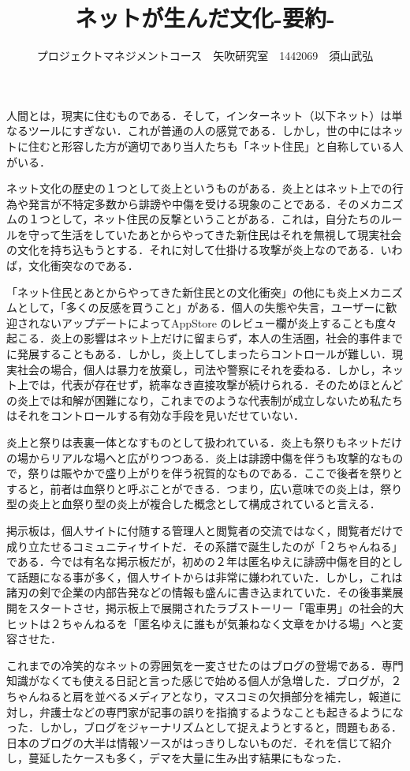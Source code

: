 \documentclass[uplatex,twocolumn,dvipdfmx]{jsarticle}
\title{\vspace{-5mm}\fontsize{14pt}{0pt}\selectfont ネットが生んだ文化-要約-}
\author{\normalsize プロジェクトマネジメントコース　矢吹研究室　1442069　須山武弘}
\date{}
\begin{document}
\fontsize{10.5pt}{\baselineskip}\selectfont
\maketitle


人間とは，現実に住むものである．そして，インターネット（以下ネット）は単なるツールにすぎない．これが普通の人の感覚である．しかし，世の中にはネットに住むと形容した方が適切であり当人たちも「ネット住民」と自称している人がいる．

ネット文化の歴史の１つとして炎上というものがある．炎上とはネット上での行為や発言が不特定多数から誹謗や中傷を受ける現象のことである．そのメカニズムの１つとして，ネット住民の反撃ということがある．これは，自分たちのルールを守って生活をしていたあとからやってきた新住民はそれを無視して現実社会の文化を持ち込もうとする．それに対して仕掛ける攻撃が炎上なのである．いわば，文化衝突なのである．

「ネット住民とあとからやってきた新住民との文化衝突」の他にも炎上メカニズムとして，「多くの反感を買うこと」がある．個人の失態や失言，ユーザーに歓迎されないアップデートによってAppStore のレビュー欄が炎上することも度々起こる．炎上の影響はネット上だけに留まらず，本人の生活圏，社会的事件までに発展することもある．しかし，炎上してしまったらコントロールが難しい．現実社会の場合，個人は暴力を放棄し，司法や警察にそれを委ねる．しかし，ネット上では，代表が存在せず，統率なき直接攻撃が続けられる．そのためほとんどの炎上では和解が困難になり，これまでのような代表制が成立しないため私たちはそれをコントロールする有効な手段を見いだせていない．

炎上と祭りは表裏一体となすものとして扱われている．炎上も祭りもネットだけの場からリアルな場へと広がりつつある．炎上は誹謗中傷を伴うも攻撃的なもので，祭りは賑やかで盛り上がりを伴う祝賀的なものである．ここで後者を祭りとすると，前者は血祭りと呼ぶことができる．つまり，広い意味での炎上は，祭り型の炎上と血祭り型の炎上が複合した概念として構成されていると言える．

掲示板は，個人サイトに付随する管理人と閲覧者の交流ではなく，閲覧者だけで成り立たせるコミュニティサイトだ．その系譜で誕生したのが「２ちゃんねる」である．今では有名な掲示板だが，初めの２年は匿名ゆえに誹謗中傷を目的として話題になる事が多く，個人サイトからは非常に嫌われていた．しかし，これは諸刃の剣で企業の内部告発などの情報も盛んに書き込まれていた．その後事業展開をスタートさせ，掲示板上で展開されたラブストーリー「電車男」の社会的大ヒットは２ちゃんねるを「匿名ゆえに誰もが気兼ねなく文章をかける場」へと変容させた．

これまでの冷笑的なネットの雰囲気を一変させたのはブログの登場である．専門知識がなくても使える日記と言った感じで始める個人が急増した．ブログが，２ちゃんねると肩を並べるメディアとなり，マスコミの欠損部分を補完し，報道に対し，弁護士などの専門家が記事の誤りを指摘するようなことも起きるようになった．しかし，ブログをジャーナリズムとして捉えようとすると，問題もある．日本のブログの大半は情報ソースがはっきりしないものだ．それを信じて紹介し，蔓延したケースも多く，デマを大量に生み出す結果にもなった．
\end{document}

